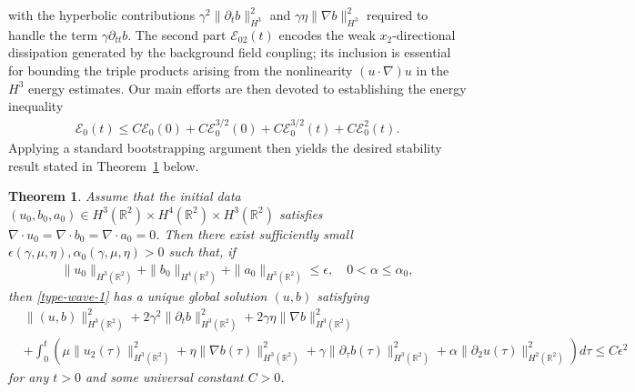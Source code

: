 \documentclass[reqno,11pt]{amsart}
\newtheorem{Thm}{Theorem}
\numberwithin{Thm}{section}
\begin{document}
with the hyperbolic contributions $\gamma^2\|\partial_t b\|_{H^3}^2$ and
$\gamma\eta\|\nabla b\|_{H^3}^2$ required to handle the term $\gamma\partial_{tt}b$.
The second part $\mathcal{E}_{02}(t)$ encodes the weak $x_2$-directional dissipation
generated by the background field coupling; its inclusion is essential for bounding the
triple products arising from the nonlinearity $(u\cdot\nabla)u$ in the $H^3$ energy
estimates. Our main efforts are then devoted to establishing the energy inequality
\begin{align}\label{E0}
	\mathcal{E}_0(t) \leq C\mathcal{E}_0(0) + C\mathcal{E}_0^{3/2}(0)
	+ C\mathcal{E}_0^{3/2}(t) + C\mathcal{E}_0^2(t).
\end{align}
Applying a standard bootstrapping argument then yields the desired stability result
stated in Theorem~\ref{Thm1} below.
\begin{Thm}\label{Thm1}
	Assume that the initial data $(u_0,b_0,a_0)\in H^3(\mathbb{R}^2)\times H^4(\mathbb{R}^2)\times H^3(\mathbb{R}^2)$ satisfies $\nabla\cdot u_0=\nabla\cdot b_0=\nabla\cdot a_0=0$. Then there exist sufficiently small $\epsilon(\gamma,\mu,\eta),\alpha_0(\gamma,\mu,\eta)>0$ such that, if
	\begin{align}\label{intia}
		\|u_0\|_{H^3(\mathbb{R}^2)}+\|b_0\|_{H^4(\mathbb{R}^2)}+\|a_0\|_{H^3(\mathbb{R}^2)}\leq \epsilon,\quad 0<\alpha\leq\alpha_0,
	\end{align}
	then \eqref{type-wave-1} has a unique global solution $(u,b)$ satisfying
	\begin{align}\label{stability}
		&\|(u,b)\|^2_{H^3(\mathbb{R}^2)}+2\gamma^2\|\partial_tb\|^2_{H^3(\mathbb{R}^2)}
		+2\gamma\eta\|\nabla b\|^2_{H^3(\mathbb{R}^2)}\nonumber\\
		&+\int_0^t\left(\mu\|u_2(\tau)\|^2_{H^3(\mathbb{R}^2)}+\eta\|\nabla b(\tau)\|^2_{H^3(\mathbb{R}^2)}
		+\gamma\|\partial_{\tau}b(\tau)\|^2_{H^3(\mathbb{R}^2)}+\alpha\|\partial_2u(\tau)\|_{H^2(\mathbb{R}^2)}^2\right)d\tau
		\leq C\epsilon^2
	\end{align}
	for any $t>0$ and some universal constant $C>0$.
\end{Thm}
\end{document}
